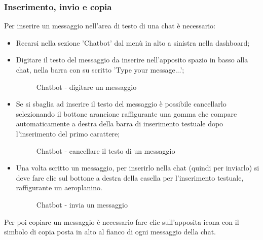 \documentclass[10pt, a4paper]{article}
\begin{document}
\subsubsection{Inserimento, invio e copia}
Per inserire un messaggio nell'area di testo di una chat è necessario:
\begin{itemize}
    \item Recarsi nella sezione 'Chatbot' dal menù in alto a sinistra nella dashboard;
    \item Digitare il testo del messaggio da inserire nell'apposito spazio in basso alla chat, nella barra con su scritto 'Type your message...';
    \begin{figure}[H]
        \centering  
        \caption{Chatbot - digitare un messaggio}
    \end{figure}
    \item Se si sbaglia ad inserire il testo del messaggio è possibile cancellarlo selezionando il bottone arancione raffigurante una gomma che compare automaticamente a destra della barra di inserimento testuale dopo l'inserimento del primo carattere;
    \begin{figure}[H]
        \centering  
        \caption{Chatbot - cancellare il testo di un messaggio}
    \end{figure}
    \item Una volta scritto un messaggio, per inserirlo nella chat (quindi per inviarlo) si deve fare clic sul bottone a destra della casella per l'inserimento testuale, raffigurante un aeroplanino.
    \begin{figure}[H]
        \centering  
        \caption{Chatbot - invia un messaggio}
    \end{figure}
\end{itemize}
Per poi copiare un messaggio è necessario fare clic sull'apposita icona con il simbolo di copia posta in alto al fianco di ogni messaggio della chat.
\end{document}
